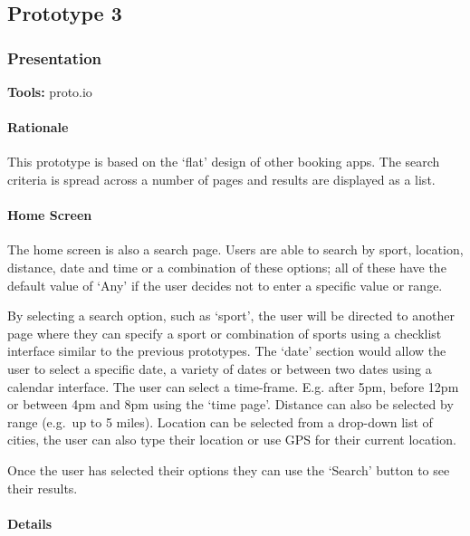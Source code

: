 \subsection{Prototype 3}
\label{sub:prototype_3}

\subsubsection{Presentation}
\textbf{Tools:} proto.io

\paragraph{Rationale}

This prototype is based on the `flat' design of other booking apps. The search
criteria is spread across a number of pages and results are displayed as a
list.

\paragraph{Home Screen}

The home screen is also a search page. Users are able to search by sport,
location, distance, date and time or a combination of these options; all of
these have the default value of `Any' if the user decides not to enter a
specific value or range.

By selecting a search option, such as `sport', the user will be directed to
another page where they can specify a sport or combination of sports using a
checklist interface similar to the previous prototypes. The `date' section
would allow the user to select a specific date, a variety of dates or between
two dates using a calendar interface. The user can select a time-frame. E.g.
after 5pm, before 12pm or between 4pm and 8pm using the `time page'. Distance
can also be selected by range (e.g.\ up to 5 miles). Location can be selected
from a drop-down list of cities, the user can also type their location or use
GPS for their current location.

Once the user has selected their options they can use the `Search' button to
see their results.

\paragraph{Details}

